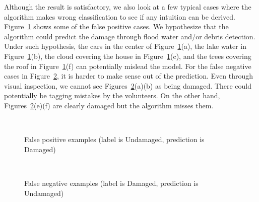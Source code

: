 \documentclass[journal, 12pt, onecolumn,draftclsnofoot]{IEEEtran}
\begin{document}
Although the result is satisfactory, we also look at a few typical cases where the algorithm makes wrong classification to see if any intuition can be derived. Figure~\ref{fig:false_positive} shows some of the false positive cases. We hypothesize that the algorithm could predict the damage through flood water and/or debris detection. Under such hypothesis, the cars in the center of Figure~\ref{fig:false_positive}(a), the lake water in Figure~\ref{fig:false_positive}(b), the cloud covering the house in Figure~\ref{fig:false_positive}(c), and the trees covering the roof in Figure~\ref{fig:false_positive}(f) can potentially mislead the model. For the false negative cases in Figure~\ref{fig:false_negative}, it is harder to make sense out of the prediction. Even through visual inspection, we cannot see Figures~\ref{fig:false_negative}(a)(b) as being damaged. There could potentially be tagging mistakes by the volunteers. On the other hand, Figures~\ref{fig:false_negative}(e)(f) are clearly damaged but the algorithm misses them. 

\begin{figure}[h]{\centering
{}
\\
\caption{\small{False positive examples (label is Undamaged, prediction is Damaged)}}
\label{fig:false_positive}
}
\end{figure}

\begin{figure}[h]{\centering
{}
\\
\caption{\small{False negative examples (label is Damaged, prediction is Undamaged)}}
\label{fig:false_negative}
}
\end{figure}
\end{document}
